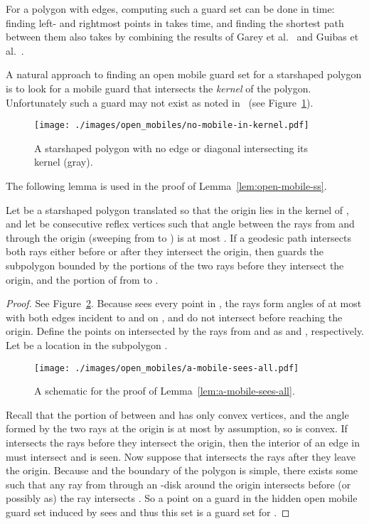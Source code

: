\documentclass{cccg12}
\begin{document}
For a polygon with  edges, computing such a guard set can be done in  time: finding left- and rightmost points in  takes  time, and finding the shortest path between them also takes  by combining the results of Garey et al.~\cite{Garey-1978} and Guibas et al.~\cite{Guibas-1987}.

A natural approach to finding an open mobile guard set for a starshaped polygon is to look for a mobile guard that intersects the \emph{kernel} of the polygon.
Unfortunately such a guard may not exist as noted in~\cite{ORourke-1987} (see Figure~\ref{fig:no-mobile-in-kernel}). 

\begin{figure}[ht]
\centering
\texttt{[image: ./images/open\_mobiles/no-mobile-in-kernel.pdf]}
\caption{A starshaped polygon with no edge or diagonal intersecting its kernel (gray).}
\label{fig:no-mobile-in-kernel}
\end{figure}

The following lemma is used in the proof of Lemma~\ref{lem:open-mobile-ss}. 

\begin{lemma}
\label{lem:a-mobile-sees-all}
Let  be a starshaped polygon translated so that the origin lies in the kernel of , and let  be consecutive reflex vertices such that angle between the rays from  and  through the origin (sweeping from  to ) is at most .
If a geodesic path  intersects both rays either before or after they intersect the origin, then  guards the subpolygon  bounded by the portions of the two rays before they intersect the origin, and the portion of  from  to .
\end{lemma}

\begin{proof}
See Figure~\ref{fig:a-mobile-sees-all}.
Because  sees every point in , the rays form angles of at most  with both edges incident to  and  on , and do not intersect  before reaching the origin.
Define the points on  intersected by the rays from  and  as  and , respectively.
Let  be a location in the subpolygon .

\begin{figure}[ht]
\centering
\texttt{[image: ./images/open\_mobiles/a-mobile-sees-all.pdf]}
\caption{A schematic for the proof of Lemma~\ref{lem:a-mobile-sees-all}.}
\label{fig:a-mobile-sees-all}
\end{figure}

Recall that the portion of  between  and  has only convex vertices, and the angle formed by the two rays at the origin is at most  by assumption, so  is convex.
If  intersects the rays before they intersect the origin, then the interior of an edge in  must intersect  and  is seen.
Now suppose that  intersects the rays after they leave the origin.
Because  and the boundary of the polygon is simple, there exists some  such that any ray from  through an -disk around the origin intersects  before (or possibly as) the ray intersects .
So a point on a guard in the hidden open mobile guard set induced by  sees  and thus this set is a guard set for .
\end{proof}
\end{document}
